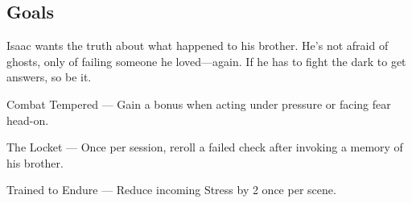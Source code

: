 \documentclass[nodeprecatedcode,bg=print]{dndbook/dndbook}
\begin{document}
\begin{WyrdCharacterSheet}
    \subsection{Goals}
    Isaac wants the truth about what happened to his brother. He’s not afraid of ghosts, only of failing someone he loved—again. If he has to fight the dark to get answers, so be it.
  
    \begin{WyrdStatsBlock}[profile=img/characters/isaac_bellamy]
        \SkillsBox[%
            expert={Will},%
            skilled={Athletics, Fight},%
            novice={Awareness, Insight, Will},%
        ]
  
        \begin{TraitsBox}
            \item[Combat Tempered] — Gain a bonus when acting under pressure or facing fear head-on.
            \item[The Locket] — Once per session, reroll a failed check after invoking a memory of his brother.
            \item[Trained to Endure] — Reduce incoming Stress by 2 once per scene.
        \end{TraitsBox}
  
        \DamageBox[%
        ]
    \end{WyrdStatsBlock}
\end{WyrdCharacterSheet}
  
\end{document}
